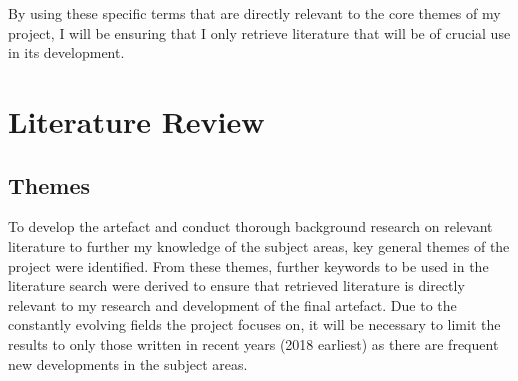 \documentclass[12pt]{report}
\begin{document}
    \noindent
    By using these specific terms that are directly relevant to the core themes of my project,
    I will be ensuring that I only retrieve literature that will be of crucial use in its 
    development.


    \chapter{Literature Review}

    \section{Themes}

    To develop the artefact and conduct thorough background research on relevant literature to further my 
    knowledge of the subject areas, key general themes of the project were identified. From these themes, further 
    keywords to be used in the literature search were derived to ensure that retrieved literature is directly relevant 
    to my research and development of the final artefact. Due to the constantly evolving fields the project focuses 
    on, it will be necessary to limit the results to only those written in recent years (2018 earliest) as there are 
    frequent new developments in the subject areas.

\end{document}
